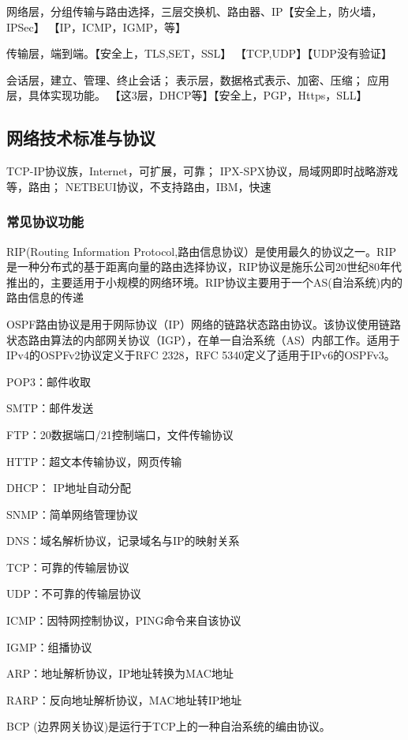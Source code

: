 \documentclass[UTF8]{../computerUniverse}
\begin{document}
网络层，分组传输与路由选择，三层交换机、路由器、IP【安全上，防火墙，IPSec】
【IP，ICMP，IGMP，等】

传输层，端到端。【安全上，TLS,SET，SSL】
【TCP,UDP】【UDP没有验证】

会话层，建立、管理、终止会话；
表示层，数据格式表示、加密、压缩；
应用层，具体实现功能。
【这3层，DHCP等】【安全上，PGP，Https，SLL】

\subsection{网络技术标准与协议}
TCP-IP协议族，Internet，可扩展，可靠；
IPX-SPX协议，局域网即时战略游戏等，路由；
NETBEUI协议，不支持路由，IBM，快速



\subsubsection{常见协议功能}

RIP(Routing Information Protocol,路由信息协议）是使用最久的协议之一。RIP是一种分布式的基于距离向量的路由选择协议，RIP协议是施乐公司20世纪80年代推出的，主要适用于小规模的网络环境。RIP协议主要用于一个AS(自治系统)内的路由信息的传递

OSPF路由协议是用于网际协议（IP）网络的链路状态路由协议。该协议使用链路状态路由算法的内部网关协议（IGP），在单一自治系统（AS）内部工作。适用于IPv4的OSPFv2协议定义于RFC 2328，RFC 5340定义了适用于IPv6的OSPFv3。

POP3：邮件收取

SMTP：邮件发送

FTP：20数据端口/21控制端口，文件传输协议

HTTP：超文本传输协议，网页传输

DHCP： IP地址自动分配

SNMP：简单网络管理协议

DNS：域名解析协议，记录域名与IP的映射关系

TCP：可靠的传输层协议

UDP：不可靠的传输层协议

ICMP：因特网控制协议，PING命令来自该协议

IGMP：组播协议

ARP：地址解析协议，IP地址转换为MAC地址

RARP：反向地址解析协议，MAC地址转IP地址

BCP (边界网关协议)是运行于TCP上的一种自治系统的编由协议。
\end{document}
